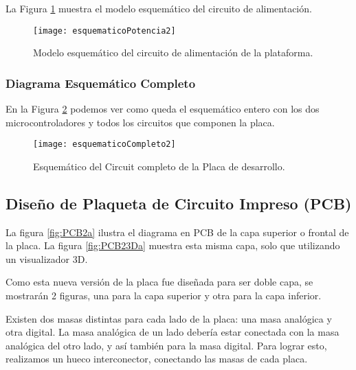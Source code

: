 La Figura \ref{fig:esquematicoPotencia2} muestra el modelo esquemático del circuito de alimentación.

\begin{figure}[H] 
\centering
  \texttt{[image: esquematicoPotencia2]}
  \caption{Modelo esquemático del circuito de alimentación de la plataforma.}\label{fig:esquematicoPotencia2}
\end{figure}


\subsubsection{Diagrama Esquemático Completo}
\label{subsubsection: esquematico_completo2}

En la Figura \ref{fig:esquematicoCompleto2} podemos ver como queda el esquemático entero con los dos microcontroladores y todos los circuitos que componen la placa.

\begin{figure}  
\centering
  \texttt{[image: esquematicoCompleto2]}
  \caption{Esquemático del Circuit completo de la Placa de desarrollo.}\label{fig:esquematicoCompleto2}
\end{figure}




\subsection{Diseño de Plaqueta de Circuito Impreso (PCB)}
\label{ subsection: diseño_pcb2}

La figura \ref{fig:PCB2a} ilustra el diagrama en PCB de la capa superior o frontal de la placa. La figura  \ref{fig:PCB23Da} muestra esta misma capa, solo que utilizando un visualizador 3D.

Como esta nueva versión de la placa fue diseñada para ser doble capa, se mostrarán 2 figuras, una para la capa superior y otra para la capa inferior.

Existen dos masas distintas para cada lado de la placa: una masa analógica y otra digital. La masa analógica de un lado debería estar conectada con la masa analógica del otro lado, y así también para la masa digital. Para lograr esto, realizamos un hueco interconector, conectando las masas de cada placa.


